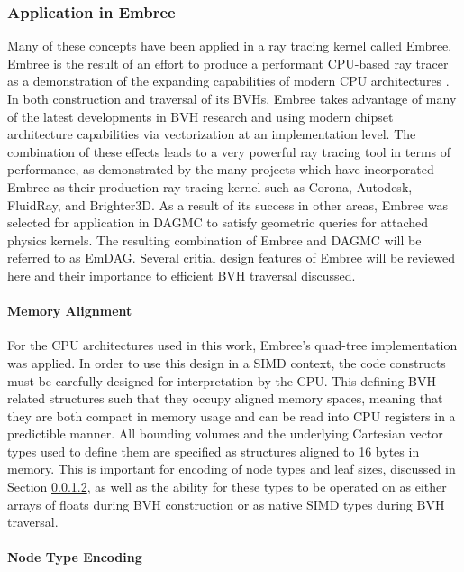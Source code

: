 \subsubsection{Application in Embree}

Many of these concepts have been applied in a ray tracing kernel called Embree.
Embree is the result of an effort to produce a performant CPU-based ray tracer
as a demonstration of the expanding capabilities of modern CPU architectures
\cite{Wald_2014}. In both construction and traversal of its BVHs, Embree takes
advantage of many of the latest developments in BVH research and using modern
chipset architecture capabilities via vectorization at an implementation level.
The combination of these effects leads to a very powerful ray tracing tool in
terms of performance, as demonstrated by the many projects which have
incorporated Embree as their production ray tracing kernel such as Corona,
Autodesk, FluidRay, and Brighter3D. As a result of its success in other areas,
Embree was selected for application in DAGMC to satisfy geometric queries for
attached physics kernels. The resulting combination of Embree and DAGMC will be
referred to as EmDAG. Several critial design features of Embree will be reviewed
here and their importance to efficient BVH traversal discussed.

\paragraph{Memory Alignment}

For the CPU architectures used in this work, Embree's quad-tree implementation
was applied. In order to use this design in a SIMD context, the code constructs
must be carefully designed for interpretation by the CPU. This defining
BVH-related structures such that they occupy aligned memory spaces, meaning that
they are both compact in memory usage and can be read into CPU registers in
a predictible manner. All bounding volumes and the underlying Cartesian vector
types used to define them are specified as structures aligned to 16 bytes in
memory. This is important for encoding of node types and leaf sizes, discussed
in Section \ref{sec:node_encoding}, as well as the ability for these types to be
operated on as either arrays of floats during BVH construction or as native SIMD
types during BVH traversal.

\paragraph{Node Type Encoding}\label{sec:node_encoding}

